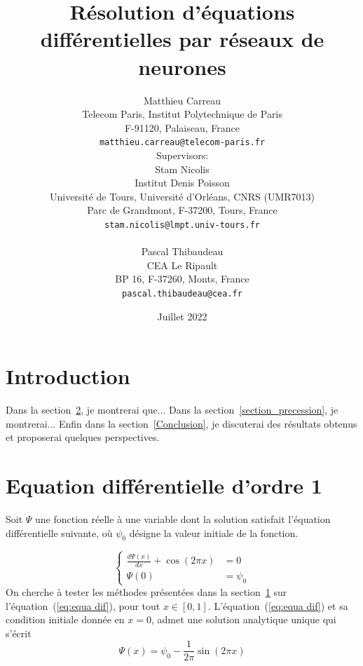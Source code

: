 \documentclass[12pt]{report}
\title{Résolution d'équations différentielles par réseaux de neurones}
\author{
  Matthieu Carreau\\
  Telecom Paris, Institut Polytechnique de Paris\\
  F-91120, Palaiseau, France\\
  \texttt{matthieu.carreau@telecom-paris.fr} \\
  [1em] Supervisors: \\
  Stam Nicolis\\
  Institut Denis Poisson\\
  Université de Tours, Université d'Orléans, CNRS (UMR7013)\\
  Parc de Grandmont, F-37200, Tours, France\\
  \texttt{stam.nicolis@lmpt.univ-tours.fr}\\
  [1em] \\
  Pascal Thibaudeau\\
  CEA Le Ripault\\
  BP 16, F-37260, Monts, France\\
  \texttt{pascal.thibaudeau@cea.fr}
}
\date{Juillet 2022}
\begin{document}
\maketitle

\begin{abstract}
    {\color{red}{Faire un résumé de ce qu'il y a dans ce document}}
\end{abstract}
    
\tableofcontents{}
    
\chapter{Introduction}
\label{Introduction}

{
    Dans la section~\ref{section_ode_1}, je montrerai que...
    Dans la section~\ref{section_precession}, je montrerai...
    Enfin dans la section~\ref{Conclusion}, je discuterai des résultats obtenus et proposerai quelques perspectives.
}

\chapter{Equation différentielle d'ordre 1}
\label{section_ode_1}

Soit $\Psi$ une fonction réelle à une variable dont la solution satisfait l'équation différentielle suivante, où $\psi_0$ désigne la valeur initiale de la fonction.

\begin{equation}
\left\{
    \begin{aligned}
        \frac{d\Psi(x)}{dx} + \cos(2\pi x) &= 0 \\
        \Psi(0) &= \psi_0
    \end{aligned}
\right.
\label{eq:equa dif}
\end{equation}
On cherche à tester les méthodes présentées dans la section~\ref{Introduction} sur l'équation~(\ref{eq:equa dif}), pour tout $x\in [0,1]$.
L'équation~(\ref{eq:equa dif}) et sa condition initiale donnée en $x=0$, admet une solution analytique unique qui s'écrit
\begin{equation}
    {\Psi}(x) = \psi_0 - \frac{1}{2\pi}\sin(2\pi x)
    \label{eq:solution analytique}
\end{equation}
\end{document}

